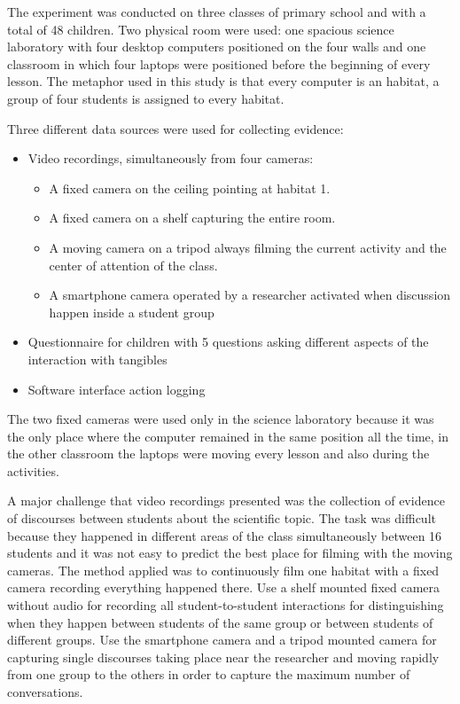 The experiment was conducted on three classes of primary school and with a total of 48 children. Two physical room were used: one spacious science laboratory with four desktop computers positioned on the four walls and one classroom in which four laptops were positioned before the beginning of every lesson. The metaphor used in this study is that every computer is an habitat, a group of four students is assigned to every habitat.

Three different data sources were used for collecting evidence:
\begin{itemize}
    \item Video recordings, simultaneously from four cameras:
    \begin{itemize}
        \item A fixed camera on the ceiling pointing at habitat 1.
        \item A fixed camera on a shelf capturing the entire room.
        \item A moving camera on a tripod always filming the current activity and the center of attention of the class.
        \item A smartphone camera operated by a researcher activated when discussion happen inside a student group
    \end{itemize}
    \item Questionnaire for children with 5 questions asking different aspects of the interaction with tangibles
    \item Software interface action logging
\end{itemize}

The two fixed cameras were used only in the science laboratory because it was the only place where the computer remained in the same position all the time, in the other classroom the laptops were moving every lesson and also during the activities. 

A major challenge that video recordings presented was the collection of evidence of discourses between students about the scientific topic. The task was difficult because they happened in different areas of the class simultaneously between 16 students and it was not easy to predict the best place for filming with the moving cameras. The method applied was to continuously film one habitat with a fixed camera recording everything happened there. Use a shelf mounted fixed camera without audio for recording all student-to-student interactions for distinguishing when they happen between students of the same group or between students of different groups. Use the smartphone camera and a tripod mounted camera for capturing single discourses taking place near the researcher and moving rapidly from one group to the others in order to capture the maximum number of conversations.

